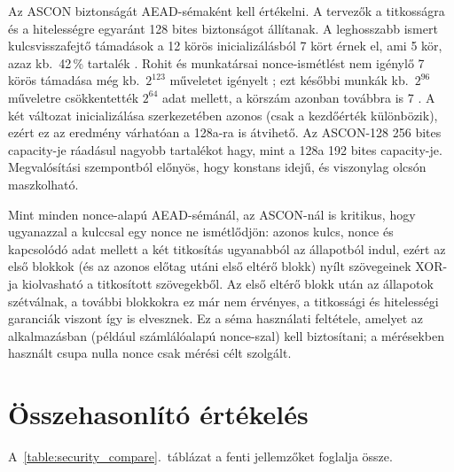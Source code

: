 \documentclass[a4paper,12pt]{report}
\theoremstyle{definition}
\theoremstyle{remark}
\begin{document}
Az ASCON biztonságát AEAD-sémaként kell értékelni. A tervezők a titkosságra és a hitelességre egyaránt 128 bites biztonságot állítanak. A leghosszabb ismert kulcsvisszafejtő támadások a 12 körös inicializálásból 7 kört érnek el, ami 5 kör, azaz kb.\ 42\,\% tartalék \cite{Dobraunig2021,Rohit2021}. Rohit és munkatársai nonce-ismétlést nem igénylő 7 körös támadása még kb.\ $2^{123}$ műveletet igényelt \cite{Rohit2021}; ezt későbbi munkák kb.\ $2^{96}$ műveletre csökkentették $2^{64}$ adat mellett, a körszám azonban továbbra is 7 \cite{Peng2025}. A két változat inicializálása szerkezetében azonos (csak a kezdőérték különbözik), ezért ez az eredmény várhatóan a 128a-ra is átvihető. Az ASCON-128 256 bites capacity-je ráadásul nagyobb tartalékot hagy, mint a 128a 192 bites capacity-je. Megvalósítási szempontból előnyös, hogy konstans idejű, és viszonylag olcsón maszkolható.

Mint minden nonce-alapú AEAD-sémánál, az ASCON-nál is kritikus, hogy ugyanazzal a kulccsal egy nonce ne ismétlődjön: azonos kulcs, nonce és kapcsolódó adat mellett a két titkosítás ugyanabból az állapotból indul, ezért az első blokkok (és az azonos előtag utáni első eltérő blokk) nyílt szövegeinek XOR-ja kiolvasható a titkosított szövegekből. Az első eltérő blokk után az állapotok szétválnak, a további blokkokra ez már nem érvényes, a titkossági és hitelességi garanciák viszont így is elvesznek. Ez a séma használati feltétele, amelyet az alkalmazásban (például számlálóalapú nonce-szal) kell biztosítani; a mérésekben használt csupa nulla nonce csak mérési célt szolgált.

\section{Összehasonlító értékelés}\label{sec:security_compare}

A~\ref{table:security_compare}.~táblázat a fenti jellemzőket foglalja össze.
\end{document}
